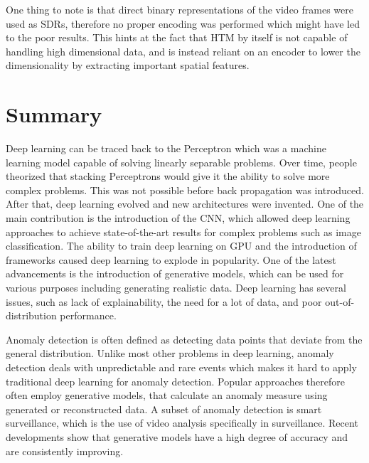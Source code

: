 One thing to note is that direct binary representations of the video frames were used as SDRs, therefore no proper encoding was performed which might have led to the poor results. This hints at the fact that HTM by itself is not capable of handling high dimensional data, and is instead reliant on an encoder to lower the dimensionality by extracting important spatial features.


\section{Summary}
Deep learning can be traced back to the Perceptron which was a machine learning model capable of solving linearly separable problems. Over time, people theorized that stacking Perceptrons would give it the ability to solve more complex problems. This was not possible before back propagation was introduced. After that, deep learning evolved and new architectures were invented. One of the main contribution is the introduction of the CNN, which allowed deep learning approaches to achieve state-of-the-art results for complex problems such as image classification. The ability to train deep learning on GPU and the introduction of frameworks caused deep learning to explode in popularity. One of the latest advancements is the introduction of generative models, which can be used for various purposes including generating realistic data. Deep learning has several issues, such as lack of explainability, the need for a lot of data, and poor out-of-distribution performance.
\par
Anomaly detection is often defined as detecting data points that deviate from the general distribution. Unlike most other problems in deep learning, anomaly detection deals with unpredictable and rare events which makes it hard to apply traditional deep learning for anomaly detection. Popular approaches therefore often employ generative models, that calculate an anomaly measure using generated or reconstructed data. A subset of anomaly detection is smart surveillance, which is the use of video analysis specifically in surveillance. Recent developments show that generative models have a high degree of accuracy and are consistently improving.
\par
